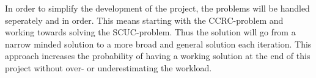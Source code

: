 \bigskip \noindent
In order to simplify the development of the project, the problems will be handled seperately and in order.
This means starting with the CCRC-problem and working towards solving the SCUC-problem.
Thus the solution will go from a narrow minded solution to a more broad and general solution each iteration.
This approach increases the probability of having a working solution at the end of this project without over- or underestimating the workload.